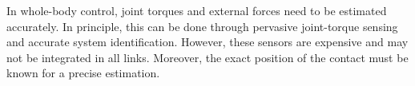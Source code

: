 % 
% 
%
%
%
%
%
%
In whole-body control, joint torques and external forces need to be estimated accurately. In principle, this can be done through pervasive joint-torque sensing and accurate system identification.
However, these sensors are expensive and may not be integrated in all links.
Moreover, the exact position of the contact must be known for  a precise estimation. 
